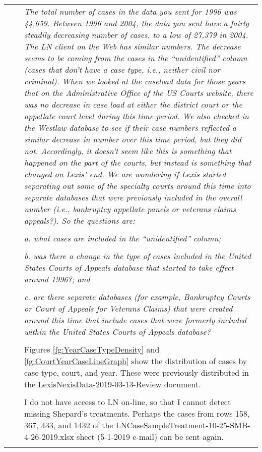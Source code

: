\documentclass[10pt, letterpaper]{article}
\begin{document}
\begin{spacing}{1.0}
\begin{longtable}{p{0.25in}p{0.25in}p{6in}}
    & & \textit{The total number of cases in the data you sent for 1996 was 44,659. Between 1996 and 2004, the data you sent have a fairly steadily decreasing number of cases, to a low of 27,379 in 2004. The LN client on the Web has similar numbers. The decrease seems to be coming from the cases in the “unidentified” column (cases that don’t have a case type, i.e., neither civil nor criminal). When we looked at the caseload data for those years that on the Administrative Office of the US Courts website, there was no decrease in case load at either the district court or the appellate court level during this time period. We also checked in the Westlaw database to see if their case numbers reflected a similar decrease in number over this time period, but they did not. Accordingly, it doesn’t seem like this is something that happened on the part of the courts, but instead is something that changed on Lexis’ end. We are wondering if Lexis started separating out some of the specialty courts around this time into separate databases that were previously included in the overall number (i.e., bankruptcy appellate panels or veterans claims appeals?). So the questions are:}\\\\ 
    & & \textit{a. what cases are included in the “unidentified” column;}\\\\
    & & \textit{b. was there a change in the type of cases included in the United States Courts of Appeals database that started to take effect around 1996?; and}\\\\
    & & \textit{c. are there separate databases (for example, Bankruptcy Courts or Court of Appeals for Veterans Claims) that were created around this time that include cases that were formerly included within the United States Courts of Appeals database?}\\\\
    
    
    & & \color{red}Figures \ref{fg:YearCaseTypeDensity} and \ref{fg:CourtYearCaseLineGraph} show the distribution of cases by case type, court, and year.  These were previously distributed in the LexisNexisData-2019-03-13-Review document.\\\\
    
    & & \color{red}I do not have access to LN on-line, so that I cannot detect missing Shepard's treatments.  Perhaps the cases from rows 158, 367, 433, and 1432 of the LNCaseSampleTreatment-10-25-SMB-4-26-2019.xlsx sheet (5-1-2019 e-mail) can be sent again. \\\\




\end{longtable}
\end{spacing}
\end{document}
